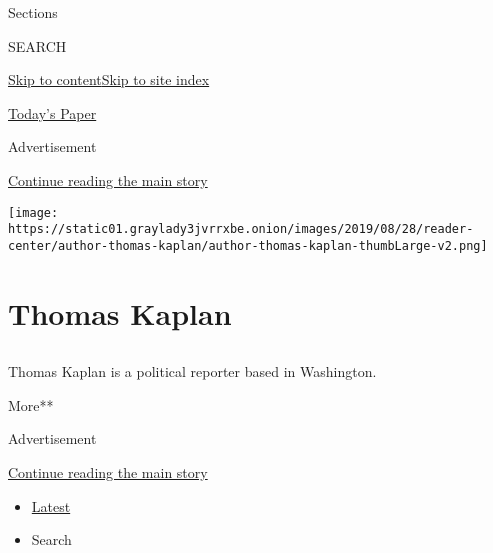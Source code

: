 Sections

SEARCH

\protect\hyperlink{site-content}{Skip to
content}\protect\hyperlink{site-index}{Skip to site index}

\href{https://myaccount.nytimes3xbfgragh.onion/auth/login?response_type=cookie\&client_id=vi}{}

\href{https://www.nytimes3xbfgragh.onion/section/todayspaper}{Today's
Paper}

Advertisement

\protect\hyperlink{after-top}{Continue reading the main story}

\texttt{[image: https://static01.graylady3jvrrxbe.onion/images/2019/08/28/reader-center/author-thomas-kaplan/author-thomas-kaplan-thumbLarge-v2.png]}

\hypertarget{thomas-kaplan}{%
\section{Thomas Kaplan}\label{thomas-kaplan}}

\subsection{}

Thomas Kaplan is a political reporter based in Washington.

More**

Advertisement

\protect\hyperlink{after-mid1}{Continue reading the main story}

\begin{itemize}
\tightlist
\item
  \protect\hyperlink{stream-panel}{Latest}
\item
  Search
\end{itemize}

